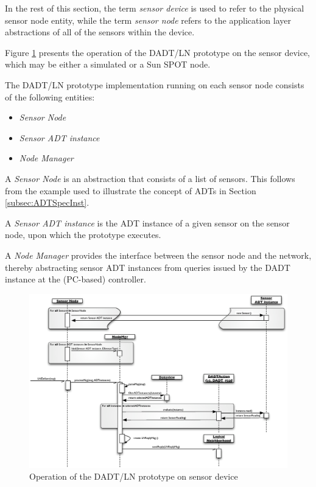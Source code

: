 In the rest of this section, the term \emph{sensor device} is used to refer to the
physical sensor node entity, while the term \emph{sensor node} refers to the application
layer abstractions of all of the sensors within the device.

Figure \ref{Fig:SeqDiagram_Sensornode} presents the operation of the DADT/LN
prototype on the sensor device, which may be either a simulated or a Sun SPOT
node.

The DADT/LN prototype implementation running on each sensor node consists of the
following entities:

\begin{itemize}
  \item \emph{Sensor Node} 
  \item \emph{Sensor ADT instance} 
  \item \emph{Node Manager} 
\end{itemize}

A \emph{Sensor Node} is an abstraction that consists of a list of sensors. This
follows from the example used to illustrate the concept of ADTs in Section
\ref{subsec:ADTSpecInst}. 

A \emph{Sensor ADT instance} is the ADT instance of a given sensor on the sensor
node, upon which the prototype executes.

A \emph{Node Manager} provides the interface between the sensor node and the
network, thereby abstracting sensor ADT instances from queries issued by the DADT
instance at the (PC-based) controller.

\begin{figure}
\centering
\includegraphics[width=\textwidth]{img/SeqDiagram_Sensornode.eps}
\caption[Operation of the DADT/LN prototype on sensor device]{Operation of the DADT/LN prototype on sensor device}
\label{Fig:SeqDiagram_Sensornode}
\end{figure}

